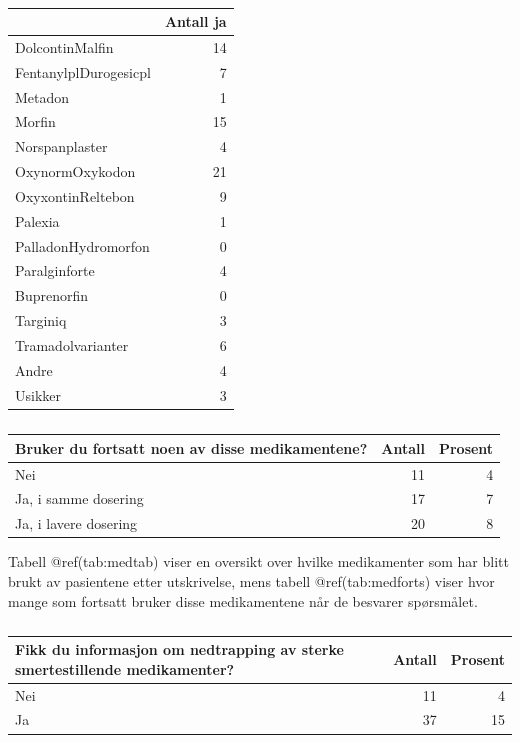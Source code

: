 \documentclass[
]{article}
\begin{document}
\begin{table}

\caption{\label{tab:medtab}}
\centering
\begin{tabular}[t]{l|r}
\hline
  & Antall ja\\
\hline
DolcontinMalfin & 14\\
\hline
FentanylplDurogesicpl & 7\\
\hline
Metadon & 1\\
\hline
Morfin & 15\\
\hline
Norspanplaster & 4\\
\hline
OxynormOxykodon & 21\\
\hline
OxyxontinReltebon & 9\\
\hline
Palexia & 1\\
\hline
PalladonHydromorfon & 0\\
\hline
Paralginforte & 4\\
\hline
Buprenorfin & 0\\
\hline
Targiniq & 3\\
\hline
Tramadolvarianter & 6\\
\hline
Andre & 4\\
\hline
Usikker & 3\\
\hline
\end{tabular}
\end{table}

\begin{table}

\caption{\label{tab:medforts}}
\centering
\begin{tabular}[t]{l|r|r}
\hline
Bruker du fortsatt noen av disse medikamentene? & Antall  & Prosent\\
\hline
Nei & 11 & 4\\
\hline
Ja, i samme dosering & 17 & 7\\
\hline
Ja, i lavere dosering & 20 & 8\\
\hline
\end{tabular}
\end{table}

Tabell @ref(tab:medtab) viser en oversikt over hvilke medikamenter som
har blitt brukt av pasientene etter utskrivelse, mens tabell
@ref(tab:medforts) viser hvor mange som fortsatt bruker disse
medikamentene når de besvarer spørsmålet.

\begin{table}

\caption{\label{tab:infonedtab}}
\centering
\begin{tabular}[t]{l|r|r}
\hline
Fikk du informasjon om nedtrapping av sterke smertestillende medikamenter? & Antall  & Prosent\\
\hline
Nei & 11 & 4\\
\hline
Ja & 37 & 15\\
\hline
\end{tabular}
\end{table}
\end{document}
